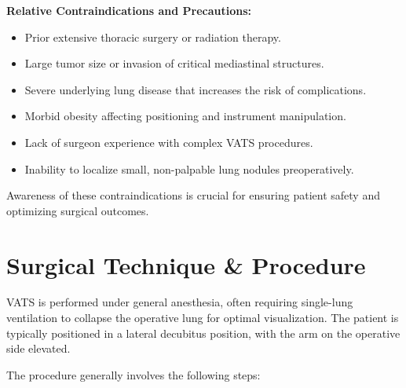 \textbf{Relative Contraindications and Precautions:}
\begin{itemize}
  \item Prior extensive thoracic surgery or radiation therapy.
  \item Large tumor size or invasion of critical mediastinal structures.
  \item Severe underlying lung disease that increases the risk of complications.
  \item Morbid obesity affecting positioning and instrument manipulation.
  \item Lack of surgeon experience with complex VATS procedures.
  \item Inability to localize small, non-palpable lung nodules preoperatively.
\end{itemize}

Awareness of these contraindications is crucial for ensuring patient safety and optimizing surgical outcomes.

\section*{Surgical Technique \& Procedure}
VATS is performed under general anesthesia, often requiring single-lung ventilation to collapse the operative lung for optimal visualization. The patient is typically positioned in a lateral decubitus position, with the arm on the operative side elevated.

The procedure generally involves the following steps:

